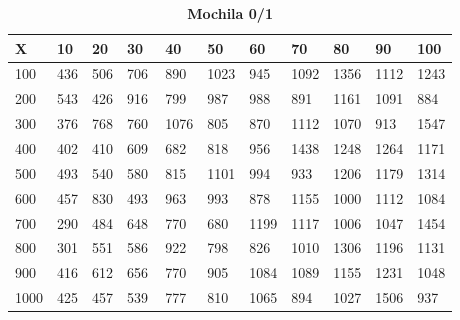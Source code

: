 \documentclass[10pt,letterpaper]{article}
\begin{document}
\newpage 
{}
\begin{center}
\begin{table}\renewcommand{\arraystretch}{2.5}
\caption{\large \textbf{Mochila 0/1}}
\centering
\begin{tabular} { |m{0.5cm}|m{1.3cm}|m{1.3cm}|m{1.3cm}|m{1.3cm}|m{1.3cm}|m{1.3cm}|m{1.3cm}|m{1.3cm}|m{1.3cm}|m{1.3cm}|} 
\hline
\rowcolor{Gray}
\centering \textbf{X} & \centering \textbf{10} & \centering \textbf{20} & \centering \textbf{30}\ & \centering \textbf{40} & \centering \textbf{50} & \centering \textbf{60}\ & \centering \textbf{70} & \centering \textbf{80} & \centering \textbf{90}\ & \textbf{100} \\\hline
\cellcolor{Gray}100 & \Large 436 & \Large 506 & \Large 706 & \Large 890 & \Large 1023 & \Large 945 & \Large 1092 & \Large 1356 & \Large 1112 & \Large 1243 \\
\hline
\cellcolor{Gray}200 & \Large 543 & \Large 426 & \Large 916 & \Large 799 & \Large 987 & \Large 988 & \Large 891 & \Large 1161 & \Large 1091 & \Large 884 \\
\hline
\cellcolor{Gray}300 & \Large 376 & \Large 768 & \Large 760 & \Large 1076 & \Large 805 & \Large 870 & \Large 1112 & \Large 1070 & \Large 913 & \Large 1547 \\
\hline
\cellcolor{Gray}400 & \Large 402 & \Large 410 & \Large 609 & \Large 682 & \Large 818 & \Large 956 & \Large 1438 & \Large 1248 & \Large 1264 & \Large 1171 \\
\hline
\cellcolor{Gray}500 & \Large 493 & \Large 540 & \Large 580 & \Large 815 & \Large 1101 & \Large 994 & \Large 933 & \Large 1206 & \Large 1179 & \Large 1314 \\
\hline
\cellcolor{Gray}600 & \Large 457 & \Large 830 & \Large 493 & \Large 963 & \Large 993 & \Large 878 & \Large 1155 & \Large 1000 & \Large 1112 & \Large 1084 \\
\hline
\cellcolor{Gray}700 & \Large 290 & \Large 484 & \Large 648 & \Large 770 & \Large 680 & \Large 1199 & \Large 1117 & \Large 1006 & \Large 1047 & \Large 1454 \\
\hline
\cellcolor{Gray}800 & \Large 301 & \Large 551 & \Large 586 & \Large 922 & \Large 798 & \Large 826 & \Large 1010 & \Large 1306 & \Large 1196 & \Large 1131 \\
\hline
\cellcolor{Gray}900 & \Large 416 & \Large 612 & \Large 656 & \Large 770 & \Large 905 & \Large 1084 & \Large 1089 & \Large 1155 & \Large 1231 & \Large 1048 \\
\hline
\cellcolor{Gray}1000 & \Large 425 & \Large 457 & \Large 539 & \Large 777 & \Large 810 & \Large 1065 & \Large 894 & \Large 1027 & \Large 1506 & \Large 937 \\
\hline
\end{tabular} \\
\end{table}
\end{center}
\end{document}
